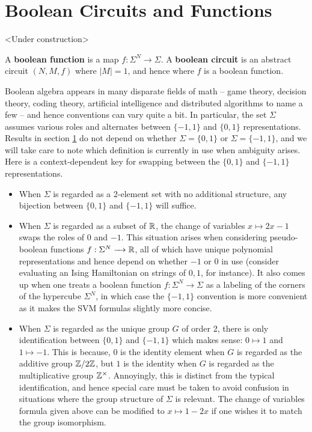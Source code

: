 \documentclass{article}
\begin{document}
\section{Boolean Circuits and Functions}\label{sec:bool-circuits}
\begin{center}
  <Under construction>
\end{center}

A \textbf{boolean function} is a map $f:\Sigma^N \to \Sigma$. A \textbf{boolean circuit} is an abstract circuit $(N, M, f)$ where $|M| = 1$, and hence where $f$ is a boolean function.

\begin{rmk}\label{rmk:sigma_convention}
  Boolean algebra appears in many disparate fields of math -- game theory, decision theory, coding theory, artificial intelligence and distributed algorithms to name a few -- and hence conventions can vary quite a bit. In particular, the set $\Sigma$ assumes various roles and alternates between $\{-1, 1\}$ and $\{0,1\}$ representations. Results in section \ref{sec:bool-circuits} do not depend on whether $\Sigma = \{0,1\}$ or $\Sigma = \{-1,1\}$, and we will take care to note which definition is currently in use when ambiguity arises. Here is a context-dependent key for swapping between the $\{0,1\}$ and $\{-1,1\}$ representations.
  \begin{itemize}
    \item When $\Sigma$ is regarded as a 2-element set with no additional structure, any bijection between $\{0,1\}$ and $\{-1,1\}$ will suffice.
    \item When $\Sigma$ is regarded as a subset of $\mathbb{R}$, the change of variables $x \mapsto 2x - 1$ swaps the roles of $0$ and $-1$. This situation arises when considering pseudo-boolean functions $f:\Sigma^N \to \bR$, all of which have unique polynomial representations and hence depend on whether $-1$ or $0$ in use (consider evaluating an Ising Hamiltonian on strings of $0,1$, for instance). It also comes up when one treats a boolean function $f:\Sigma^N \to \Sigma$ as a labeling of the corners of the hypercube $\Sigma^N$, in which case the $\{-1,1\}$ convention is more convenient as it makes the SVM formulas slightly more concise.
    \item When $\Sigma$ is regarded as the unique group $G$ of order 2, there is only identification between $\{0,1\}$ and $\{-1,1\}$ which makes sense: $0 \mapsto 1$ and $1 \mapsto -1$. This is because, $0$ is the identity element when $G$ is regarded as the additive group $\mathbb{Z}/2\mathbb{Z}$, but $1$ is the identity when $G$ is regarded as the multiplicative group $\mathbb{Z}^\times$. Annoyingly, this is distinct from the typical identification, and hence special care must be taken to avoid confusion in situations where the group structure of $\Sigma$ is relevant. The change of variables formula given above can be modified to $x \mapsto 1 - 2x$ if one wishes it to match the group isomorphism.
  \end{itemize}
\end{rmk}
\end{document}
